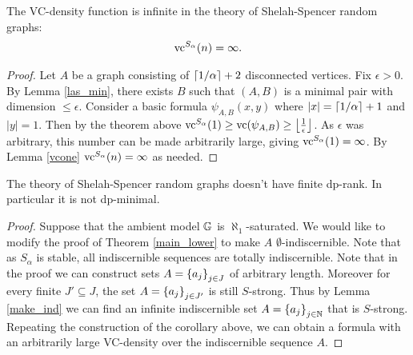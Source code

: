 \begin{Corollary}
  The VC-density function is infinite in the theory of Shelah-Spencer random graphs:
  \begin{align*}
    \operatorname{vc}^{S_\alpha}(n) = \infty.
  \end{align*}
\end{Corollary}

\begin{proof}
  Let $A$ be a graph consisting of $\left \lceil 1/\alpha \right \rceil + 2$ disconnected vertices.
  Fix $\epsilon > 0$.
  By Lemma \ref{las_min}, there exists $B$ such that $(A, B)$ is a minimal pair with dimension $\leq \epsilon$.
  Consider a basic formula $\psi_{A, B}(x, y)$ where $|x| = \left \lceil 1/\alpha \right \rceil + 1$ and $|y| = 1$.
  Then by the theorem above $\operatorname{vc}^{S_\alpha}(1) \geq \operatorname{vc} (\psi_{A,B}) \geq \left \lfloor \frac{1}{\epsilon} \right \rfloor$.
  As $\epsilon$ was arbitrary, this number can be made arbitrarily large, giving $\operatorname{vc}^{S_\alpha}(1) = \infty$.
  By Lemma \ref{vcone} $\operatorname{vc}^{S_\alpha}(n) = \infty$ as needed.
\end{proof}

\begin{Corollary}
  The theory of Shelah-Spencer random graphs doesn't have finite dp-rank.
  In particular it is not dp-minimal.
\end{Corollary}

\begin{proof}
  Suppose that the ambient model $\mathbb G$ is $\aleph_1$-saturated.
  We would like to modify the proof of Theorem \ref{main_lower} to make $A$ $\emptyset$-indiscernible.
  Note that as $S_\alpha$ is stable, all indiscernible sequences are totally indiscernible.
  Note that in the proof we can construct sets $A = \left\{a_j\right\}_{j \in J}$ of arbitrary length.
  Moreover for every finite $J' \subseteq J$, the set $A = \left\{a_j\right\}_{j \in J'}$ is still $S$-strong.
  Thus by Lemma \ref{make_ind} we can find an infinite indiscernible set $A = \left\{a_j\right\}_{j \in \mathbb{N}}$ that is $S$-strong.
  Repeating the construction of the corollary above,
  we can obtain a formula with an arbitrarily large VC-density over the indiscernible sequence $A$.
\end{proof}



